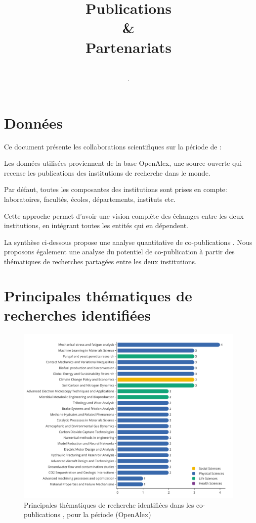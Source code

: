 \documentclass[french, 11pt]{dibiso/pubpart}
\title{Publications \\ \& \\ Partenariats}
\date{\reportyear}
\subtitle{\textbf{\entitiesacronym} \\
  \medskip
  {\entitiesfullname}·
}
\begin{document}
\renewcommand{\arraystretch}{2}


\maketitle

\tableofcontents

\pagebreak



\section{Données}

Ce document présente les collaborations scientifiques sur la période {\reportyear} de : {\entitiesfullname}

Les données utilisées proviennent de la base OpenAlex, une source ouverte qui recense les publications des institutions de recherche dans le monde.

Par défaut, toutes les composantes des institutions sont prises en compte: laboratoires, facultés, écoles, départements, instituts etc.

Cette approche permet d'avoir une vision complète des échanges entre les deux institutions, en intégrant toutes les entités qui en dépendent. 

La synthèse ci-dessous propose une analyse quantitative de co-publications {\entitiesfullname}. 
Nous proposons également une analyse du potentiel de co-publication à partir des thématiques de recherches partagées entre les deux institutions.

\pagebreak

\section{Principales thématiques de recherches identifiées}


\begin{figure}[!h]
  \includegraphics[width=\textwidth]{figures/topics_collaborations.pdf}
  \centering
  \caption{Principales thématiques de recherche identifiées dans les co-publications {\entitiesacronym}, pour la période {\reportyear} (OpenAlex)}
  \label{fig_topics_collaborations}
\end{figure}
\end{document}
